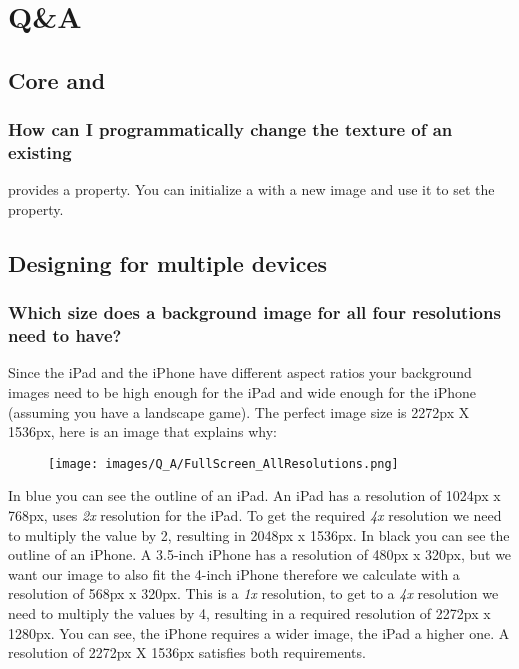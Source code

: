 \chapter{Q\&A}

\section{Core \cocos{} and \SB{}}

\subsection{How can I programmatically change the texture of an existing
\ccsprite{}}
\ccsprite{} provides a  property. You can initialize a
 with a new image and use it to set the
 property.

\section{Designing for multiple devices}

\subsection{Which size does a background image for all four resolutions need to
have?}\label{background_all_resolutions}
Since the iPad and the iPhone have different aspect ratios your
background images need to be high enough for the iPad and wide enough for the
iPhone (assuming you have a landscape game). The perfect image size is 2272px X
1536px, here is an image that explains why:

\begin{figure}[H]
		\centering
		\texttt{[image: images/Q\_A/FullScreen\_AllResolutions.png]}
\end{figure}

In blue you can see the outline of an iPad. An iPad has a resolution of
1024px x 768px, \SB{} uses \textit{2x} resolution for the iPad. To get the
required \textit{4x} resolution we need to multiply the value by 2, resulting in 2048px x 1536px.
In black you can see the outline of an iPhone. A 3.5-inch iPhone has a resolution
of 480px x 320px, but we want our image to also fit the 4-inch iPhone therefore
we calculate with a resolution of 568px x 320px. This is a \textit{1x}
resolution, to get to a \textit{4x} resolution we need to multiply the values by
4, resulting in a required resolution of 2272px x 1280px. You can see, the
iPhone requires a wider image, the iPad a higher one. A resolution of 2272px X
1536px satisfies both requirements. 

